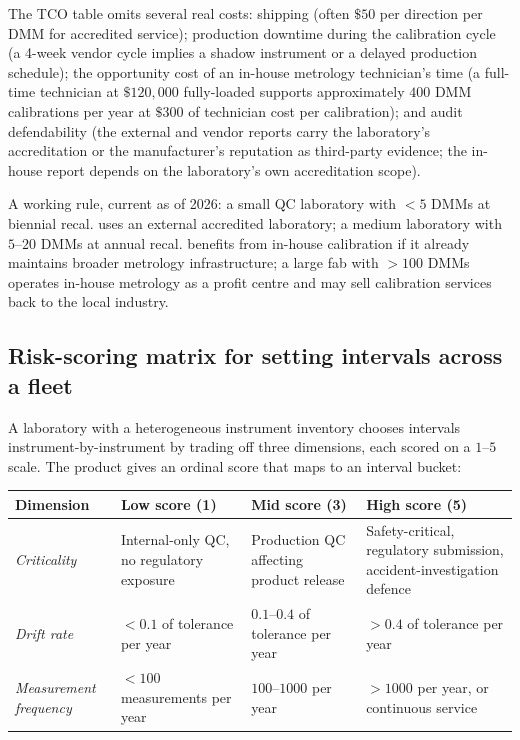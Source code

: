 The TCO table omits several real costs: shipping (often $\$50$ per
direction per DMM for accredited service); production downtime
during the calibration cycle (a 4-week vendor cycle implies a
shadow instrument or a delayed production schedule); the
opportunity cost of an in-house metrology technician's time (a
full-time technician at $\$120{,}000$ fully-loaded supports
approximately $400$ DMM calibrations per year at $\$300$ of
technician cost per calibration); and audit defendability (the
external and vendor reports carry the laboratory's accreditation
or the manufacturer's reputation as third-party evidence; the
in-house report depends on the laboratory's own accreditation
scope).

A working rule, current as of 2026: a small QC laboratory with
$< 5$ DMMs at biennial recal. uses an external accredited
laboratory; a medium laboratory with $5$--$20$ DMMs at annual recal.
benefits from in-house calibration if it already maintains broader
metrology infrastructure; a large fab with $> 100$ DMMs operates
in-house metrology as a profit centre and may sell calibration
services back to the local industry.

\subsection{Risk-scoring matrix for setting intervals across a fleet}

A laboratory with a heterogeneous instrument inventory chooses
intervals instrument-by-instrument by trading off three
dimensions, each scored on a $1$--$5$ scale. The product gives an
ordinal score that maps to an interval bucket:

\begin{center}
\small
\begin{tabular}{p{3.2cm}p{3.5cm}p{3.5cm}p{3.5cm}}
\toprule
Dimension & Low score (1) & Mid score (3) & High score (5) \\
\midrule
\emph{Criticality}
  & Internal-only QC, no regulatory exposure
  & Production QC affecting product release
  & Safety-critical, regulatory submission, accident-investigation
    defence \\
\emph{Drift rate}
  & $< 0.1$ of tolerance per year
  & $0.1$--$0.4$ of tolerance per year
  & $> 0.4$ of tolerance per year \\
\emph{Measurement frequency}
  & $< 100$ measurements per year
  & $100$--$1000$ per year
  & $> 1000$ per year, or continuous service \\
\bottomrule
\end{tabular}
\end{center}

